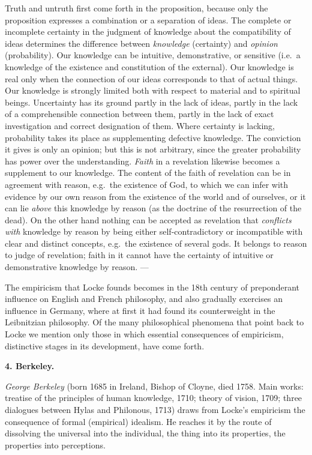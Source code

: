 Truth and untruth first come forth in the proposition, because only the
proposition expresses a combination or a separation of ideas. The
complete or incomplete certainty in the judgment of knowledge about the
compatibility of ideas determines the difference between
\emph{knowledge} (certainty) and \emph{opinion} (probability). Our
knowledge can be intuitive, demonstrative, or sensitive (i.e.\ a
knowledge of the existence and constitution of the external). Our
knowledge is real only when the connection of our ideas corresponds to
that of actual things. Our knowledge is strongly limited both with
respect to material and to spiritual beings. Uncertainty has its ground
partly in the lack of ideas, partly in the lack of a comprehensible
connection between them, partly in the lack of exact investigation and
correct designation of them. Where certainty is lacking, probability
takes its place as supplementing defective knowledge. The conviction it
gives is only an opinion; but this is not arbitrary, since the greater
probability has power over the understanding. \emph{Faith} in a
revelation likewise becomes a supplement to our knowledge. The content
of the faith of revelation can be in agreement with reason, e.g.\ the
existence of God, to which we can infer with evidence by our own reason
from the existence of the world and of ourselves, or it can lie
\emph{above} this knowledge by reason (as the doctrine of the
resurrection of the dead). On the other hand nothing can be accepted as
revelation that \emph{conflicts with} knowledge by reason by being
either self-contradictory or incompatible with clear and distinct
concepts, e.g.\ the existence of several gods. It belongs to reason to
judge of revelation; faith in it cannot have the certainty of
intuitive or demonstrative knowledge by reason. ---

The empiricism that Locke founds becomes in the 18th century of
preponderant influence on English and French philosophy, and also
gradually exercises an influence in Germany, where at first it had
found its counterweight in the Leibnitzian philosophy. Of the many
philosophical phenomena that point back to Locke we mention only those
in which essential consequences of empiricism, distinctive stages in
its development, have come forth.

\divrule

\begin{center}
  \textbf{4. Berkeley.}
\end{center}

\emph{George Berkeley} (born 1685 in Ireland, Bishop of Cloyne, died
1758. Main works: treatise of the principles of human knowledge, 1710;
theory of vision, 1709; three dialogues between Hylas and Philonous,
1713) draws from Locke's empiricism the consequence of formal
(empirical) idealism. He reaches it by the route of dissolving the
universal into the individual, the thing into its properties, the
properties into perceptions.

